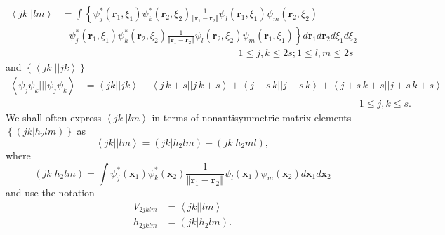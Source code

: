 \documentclass[aps,preprint]{revtex4}%
\begin{document}
\begin{align}
\left\langle jk||lm\right\rangle  &  =\int\left\{  \psi_{j}^{\ast}\left(
\boldsymbol{r}_{1},\xi_{1}\right)  \psi_{k}^{\ast}\left(  \boldsymbol{r}%
_{2},\xi_{2}\right)  \frac{1}{\left\Vert \boldsymbol{r}_{1}-\boldsymbol{r}%
_{2}\right\Vert }\psi_{l}\left(  \boldsymbol{r}_{1},\xi_{1}\right)  \psi
_{m}\left(  \boldsymbol{r}_{2},\xi_{2}\right)  \right. \nonumber\\
&  -\left.  \psi_{j}^{\ast}\left(  \boldsymbol{r}_{1},\xi_{1}\right)  \psi
_{k}^{\ast}\left(  \boldsymbol{r}_{2},\xi_{2}\right)  \frac{1}{\left\Vert
\boldsymbol{r}_{1}-\boldsymbol{r}_{2}\right\Vert }\psi_{l}\left(
\boldsymbol{r}_{2},\xi_{2}\right)  \psi_{m}\left(  \boldsymbol{r}_{1},\xi
_{1}\right)  \right\}  d\boldsymbol{r}_{1}d\boldsymbol{r}_{2}d\xi_{1}d\xi
_{2}\nonumber\\
&  \left.  {}\right.  \qquad\qquad\qquad\qquad\qquad\qquad\qquad\qquad
\qquad1\leq j,k\leq2s;1\leq l,m\leq2s \label{h2}%
\end{align}
and $\left\{  \left\langle jk|||jk\right\rangle \right\}  $
\begin{align}
\left\langle \psi_{j}\psi_{k}|||\psi_{j}\psi_{k}\right\rangle  &
=\left\langle jk||jk\right\rangle +\left\langle j\,k+s||j\,k+s\right\rangle
+\left\langle j+s\,k||j+s\,k\right\rangle +\left\langle
j+s\,k+s||j+s\,k+s\right\rangle \nonumber\\
&  \left.  {}\right.  \qquad\qquad\qquad\qquad\qquad\qquad\qquad\qquad
\qquad\qquad\qquad\qquad\qquad\qquad1\leq j,k\leq s.
\end{align}
We shall often express $\left\langle jk||lm\right\rangle $ in terms of
nonantisymmetric matrix elements $\left\{  \left(  \left.  jk\right\vert
h_{2}lm\right)  \right\}  $ as
\begin{equation}
\left\langle jk||lm\right\rangle =\left(  \left.  jk\right\vert h_{2}%
lm\right)  -\left(  \left.  jk\right\vert h_{2}ml\right)  ,
\end{equation}
where
\begin{equation}
\left(  \left.  jk\right\vert h_{2}lm\right)  =\int\psi_{j}^{\ast}\left(
\boldsymbol{x}_{1}\right)  \psi_{k}^{\ast}\left(  \boldsymbol{x}_{2}\right)
\frac{1}{\left\Vert \boldsymbol{r}_{1}-\boldsymbol{r}_{2}\right\Vert }\psi
_{l}\left(  \boldsymbol{x}_{1}\right)  \psi_{m}\left(  \boldsymbol{x}%
_{2}\right)  d\boldsymbol{x}_{1}d\boldsymbol{x}_{2}%
\end{equation}
and use the notation
\begin{align}
V_{2jklm}  &  =\left\langle jk||lm\right\rangle \nonumber\\
h_{2jklm}  &  =\left(  \left.  jk\right\vert h_{2}lm\right)  .
\end{align}
\end{document}
